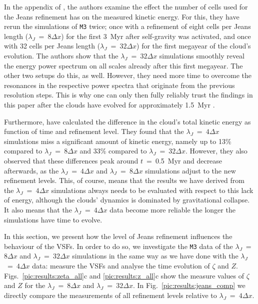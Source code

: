 In the appendix of , the authors examine the effect the number of cells used for the Jeans refinement has on the measured kinetic energy.
For this, they have rerun the simulations of \texttt{M3} twice; 
once with a refinement of eight cells per Jeans length ($\lambda_J$~=~$8\Delta{}x$) for the first 3~Myr after self-gravity was activated, and once with 32 cells per Jeans length ($\lambda_J$~=~$32\Delta{}x$) for the first megayear of the cloud's evolution.
The authors show that the $\lambda_J$~=~$32\Delta{}x$ simulations smoothly reveal the energy power spectrum on all scales already after this first megayear.
The other two setups do this, as well.
However, they need more time to overcome the resonances in the respective power spectra that originate from the previous resolution steps. 
This is why one can only then fully reliably trust the findings in this paper after the clouds have evolved for approximately 1.5~Myr \citep[see also][]{IbanezMejia2017,Seifried2017b}.

Furthermore,  have calculated the difference in the cloud's total kinetic energy as function of time and refinement level.
They found that the $\lambda_J$~=~$4\Delta{}x$ simulations miss a significant amount of kinetic energy, namely up to 13\% compared to $\lambda_J$~=~$8\Delta{}x$ and 33\% compared to $\lambda_J$~=~$32\Delta{}x$.
However, they also observed that these differences peak around $t$~=~0.5~Myr and decrease afterwards, as the $\lambda_J$~=~$4\Delta{}x$ and $\lambda_J$~=~$8\Delta{}x$ simulations adjust to the new refinement levels.
This, of course, means that the results we have derived from the $\lambda_J$~=~$4\Delta{}x$ simulations always needs to be evaluated with respect to this lack of energy, although the clouds' dynamics is dominated by gravitational collapse.
It also means that the $\lambda_J$~=~$4\Delta{}x$ data become more reliable the longer the simulations have time to evolve.

In this section, we present how the level of Jeans refinement influences the behaviour of the VSFs.
In order to do so, we investigate the \texttt{M3} data of the $\lambda_J$~=~$8\Delta{}x$ and $\lambda_J$~=~$32\Delta{}x$ simulations in the same way as we have done with the $\lambda_J$~=~$4\Delta{}x$ data: measure the VSFs and analyse the time evolution of $\zeta$ and $Z$.
Figs.~\ref{pic:results:zeta_all}c and \ref{pic:results:z_all}c show the measure values of $\zeta$ and $Z$ for the $\lambda_J$~=~$8\Delta{}x$ and $\lambda_J$~=~$32\Delta{}x$.
In Fig.~\ref{pic:results:jeans_comp} we directly compare the measurements of all refinement levels relative to $\lambda_J$~=~$4\Delta{}x$.

